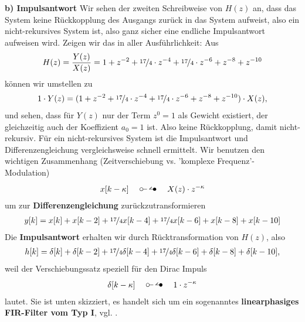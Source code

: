 \begin{ExCalc}
\textbf{b) Impulsantwort}
Wir sehen der zweiten Schreibweise von $H(z)$ an, dass das System keine Rückkopplung des Ausgangs zurück in
das System aufweist, also ein nicht-rekursives System ist, also ganz sicher
eine endliche Impulsantwort aufweisen wird.
%
Zeigen wir das in aller Ausführlichkeit: Aus
\begin{align}
H(z) = \frac{Y(z)}{X(z)}
= 1            + z^{-2} + \nicefrac{17}{4}\cdot z^{-4}  + \nicefrac{17}{4}\cdot z^{-6} + z^{-8} + z^{-10}
\end{align}
können wir umstellen zu
\begin{align}
1 \cdot Y(z)
= (1            + z^{-2} + \nicefrac{17}{4}\cdot z^{-4}  + \nicefrac{17}{4}\cdot z^{-6} + z^{-8} + z^{-10})
\cdot X(z),
\end{align}
und sehen, dass für $Y(z)$ nur der Term $z^0=1$ als Gewicht existiert, der gleichzeitig
auch der Koeffizient $a_0=1$ ist. Also keine Rückkopplung, damit nicht-rekursiv.
%
Für ein nicht-rekursives System ist die Impulsantwort und Differenzengleichung
vergleichsweise schnell ermittelt.
%
Wir benutzen den wichtigen Zusammenhang (Zeitverschiebung vs. 'komplexe Frequenz'-
Modulation)
\begin{align}
x[k-\kappa] \quad\ztransf\quad X(z) \cdot z^{-\kappa}
\end{align}
um zur \textbf{Differenzengleichung} zurückzutransformieren
\begin{align}
y[k] = x[k] + x[k-2] + \nicefrac{17}{4} x[k-4] + \nicefrac{17}{4} x[k-6] + x[k-8] + x[k-10]
\end{align}
Die \textbf{Impulsantwort} erhalten wir durch Rücktransformation von $H(z)$, also
\begin{align}
h[k] = \delta[k] + \delta[k-2] + \nicefrac{17}{4} \delta[k-4] + \nicefrac{17}{4} \delta[k-6] + \delta[k-8] + \delta[k-10],
\end{align}
weil der Verschiebungssatz speziell für den Dirac Impuls
\begin{align}
\delta[k-\kappa] \quad\ztransf\quad 1 \cdot z^{-\kappa}
\end{align}
lautet. Sie ist unten skizziert, es handelt sich um ein sogenanntes
\textbf{linearphasiges FIR-Filter vom Typ I}, vgl. \cite{Oppenheim2010, Oppenheim2004}.
%
\begin{center}
\end{center}
\end{ExCalc}
